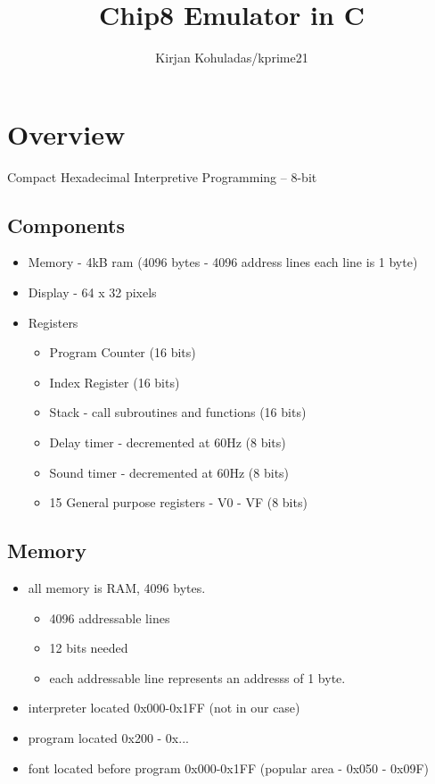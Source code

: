 \documentclass{article}
\title{\vspace{-7em} Chip8 Emulator in C}
\author{Kirjan Kohuladas/kprime21}
\date{}
\begin{document}
\maketitle


\section*{Overview}
Compact Hexadecimal Interpretive Programming – 8-bit 
\subsection*{Components}
\begin{itemize}
	\item Memory - 4kB ram (4096 bytes - 4096 address lines each line is 1 byte)
	\item Display - 64 x 32 pixels 
	\item Registers
		\begin{itemize}
			\item Program Counter (16 bits)
			\item Index Register (16 bits) 
			\item Stack - call subroutines and functions (16 bits)
			\item Delay timer - decremented at 60Hz (8 bits)
			\item Sound timer - decremented at 60Hz (8 bits)
			\item 15 General purpose registers - V0 - VF (8 bits)
		\end{itemize}
\end{itemize}
\subsection*{Memory}
\begin{itemize}
	\item all memory is RAM, 4096 bytes. 
		\begin{itemize}
			\item 4096 addressable lines
			\item 12 bits needed
			\item each addressable line represents an addresss of 1 byte.
		\end{itemize}
	\item interpreter located 0x000-0x1FF (not in our case)
	\item program located 0x200 - 0x...
	\item font located before program 0x000-0x1FF (popular area - 0x050 - 0x09F)
\end{itemize}
\end{document}
